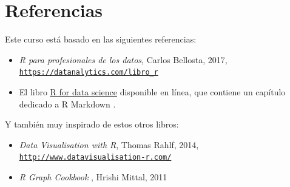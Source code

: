 \documentclass[
]{article}
\numberwithin{ejcnt}{section}
\begin{document}
\hypertarget{referencias}{%
\section{Referencias}\label{referencias}}

Este curso está basado en las siguientes referencias:

\begin{itemize}
\item
  \emph{R para profesionales de los datos}, Carlos Bellosta, 2017,
  \href{https://datanalytics.com/libro_r}{\texttt{https://datanalytics.com/libro\_r}}
\item
  El libro \href{http://r4ds.had.co.nz/r-markdown.html}{R for data science} disponible en línea, que contiene un capítulo dedicado a R Markdown .
\end{itemize}

Y también muy inspirado de estos otros libros:

\begin{itemize}
\item
  \emph{Data Visualisation with R}, Thomas Rahlf, 2014, \href{http://www.datavisualisation-r.com/}{\texttt{http://www.datavisualisation-r.com/}}
\item
  \emph{R Graph Cookbook} , Hrishi Mittal, 2011
\end{itemize}
\end{document}
